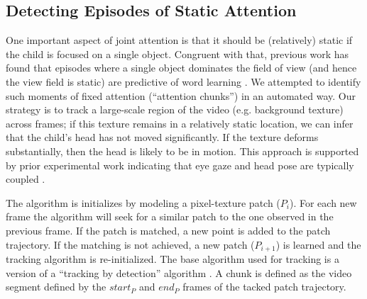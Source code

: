 \documentclass[10pt,letterpaper]{article}
\begin{document}
\subsection{Detecting Episodes of Static Attention}

One important aspect of joint attention is that it should be (relatively) static if the child is focused on a single object. Congruent with that, previous work has found that episodes where a single object dominates the field of view (and hence the view field is static) are predictive of word learning \cite{smith2011,pereira2013}. We attempted to identify such moments of fixed attention (``attention chunks'') in an automated way. Our strategy is to track a large-scale region of the video (e.g. background texture) across frames; if this texture remains in a relatively static location, we can infer that the child's head has not moved significantly. If the texture deforms substantially, then the head is likely to be in motion. This approach is supported by prior experimental work indicating that eye gaze and head pose are typically coupled \cite{yoshida2008}. %




The algorithm is initializes by modeling a pixel-texture patch ($P_{i}$). For each new frame the algorithm will seek for a similar patch to the one observed in the previous frame. If the patch is matched, a new point is added to the patch trajectory. If the matching is not achieved, a new patch ($P_{i+1}$) is learned and the tracking algorithm is re-initialized. The base algorithm used for tracking is a version of a ``tracking by detection'' algorithm \cite{kalal}. A chunk is defined as the video segment defined by the $start_{P}$ and $end_{P}$ frames of the tacked patch trajectory.

\end{document}
